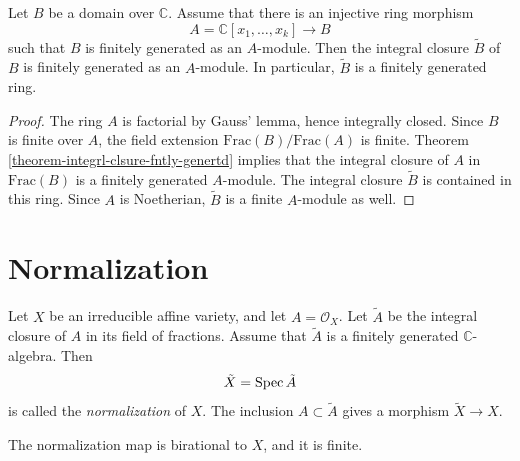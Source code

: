 \begin{lemma}
\label{lemma-normalization}
Let $B$ be a domain over $\mathbb{C}$.
Assume that there is an injective
ring morphism
$$
A=\mathbb{C}[x_1,\ldots,x_k]\to B
$$
such that $B$ is finitely generated
as an $A$-module.
Then the integral closure $\tilde{B}$
of $B$ is finitely generated
as an $A$-module.
In particular, $\tilde{B}$ is a
finitely generated ring.
\end{lemma}

\begin{proof}
The ring $A$ is factorial by Gauss'
lemma, hence integrally closed.
Since $B$ is finite over $A$,
the field extension
$\text{Frac}(B)/\text{Frac}(A)$
is finite.
Theorem
\ref{theorem-integrl-clsure-fntly-genertd}
implies that the integral closure
of $A$ in $\text{Frac}(B)$
is a finitely generated $A$-module.
The integral closure $\tilde{B}$
is contained in this ring.
Since $A$ is Noetherian, $\tilde{B}$
is a finite $A$-module as well.
\end{proof}

\section{Normalization}
\label{section-normalization}

\begin{definition}
\label{definition-normalization}
Let $X$ be an irreducible affine variety,
and let $A=\mathcal{O}_X$.
Let $\tilde{A}$ be the integral closure
of $A$ in its field of fractions.
Assume that $\tilde{A}$ is a finitely
generated $\mathbb{C}$-algebra.
Then
$$
\tilde{X}=\mathop{\mathrm{Spec}} \tilde{A}
$$
is called the {\it normalization} of $X$.
The inclusion $A \subset \tilde{A}$
gives a morphism
$\tilde{X}\to X$.
\end{definition}

\noindent
The normalization map is birational
to $X$, and it is finite.

